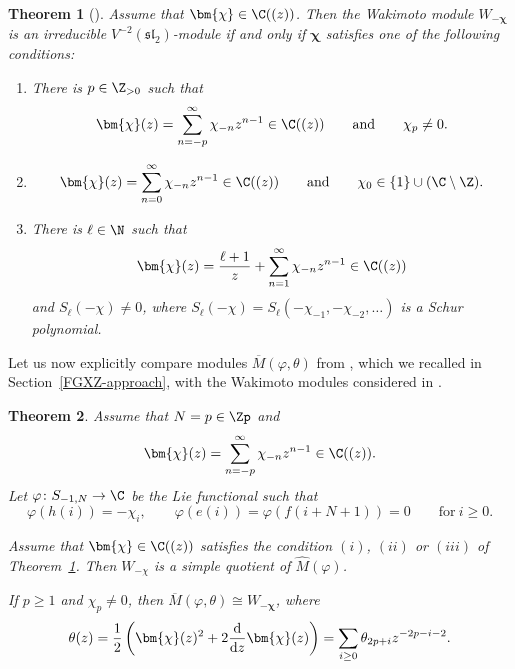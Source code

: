 \documentclass[10pt,a4paper]{amsart}
\numberwithin{equation}{section}
\newtheorem{Theorem}{Theorem}[section]
\theoremstyle{definition}
\newcommand{\1}{\textbf{1}}
\begin{document}
\begin{Theorem}[\cite{A-07, A-14}] \label{A14}
Assume that $\bm{\chi} \in {\C}((z))$. Then the Wakimoto module
$W_{-\bm{\chi}}$ is an irreducible $V^{-2}(\mathfrak{sl}_2)$-module if and only
if $\bm{\chi}$ satisfies one of the following conditions:
\begin{enumerate}\itemsep=0pt
\item[$(i)$] There is $p \in {\Z}_{>0}$
 such that
\[ \bm{\chi}(z) = \sum_{n=-p} ^{\infty} {\chi}_{-n} z ^{n-1} \in
{\C}((z)) \qquad \mbox{and} \qquad
\chi_p \ne 0. \]

\item[$(ii)$] \[ \bm{\chi}(z) = \sum_{n=0} ^{\infty} {\chi}_{-n} z
^{n-1} \in {\C}((z)) \qquad \mbox{and} \qquad
\chi_0 \in \{1 \} \cup ({\C} \setminus {\Z}). \]
\item[$(iii)$] There is $\ell \in {\N}$ such that
\[ \bm{\chi}(z) = \frac{\ell +1}{z} + \sum_{n=1} ^{\infty} {\chi}_{-n} z ^{n-1} \in
{\C}((z))\]
and $S_{\ell}(-\chi) \ne 0$,
where $S_{\ell}(-\chi) = S_{\ell}(-\chi_{-1}, -\chi_{-2}, \dots)$
is a Schur polynomial.
\end{enumerate}
\end{Theorem}

Let us now explicitly compare modules $\overline M(\varphi, \theta )$ from \cite{FGXZ}, which we recalled in Section~\ref{FGXZ-approach}, with the Wakimoto modules considered in \cite{A-07, A-14}.

\begin{Theorem} \label{krit-kvocijenti}
 Assume that $N=p \in {\Zp}$ and
 \[ \bm{\chi}(z) = \sum_{n=-p} ^{\infty} {\chi}_{-n} z ^{n-1} \in
{\C}((z)). \]
Let $\varphi \colon S_{-1, N} \rightarrow {\C}$ be the Lie functional such that \[\varphi(h(i)) = -\chi_i, \qquad \varphi(e(i)) = \varphi(f(i+N+1)) =0 \qquad \mbox{for} \ i \ge 0. \]

Assume that $\bm{\chi} \in {\C}((z))$ satisfies the condition $(i)$, $(ii)$ or $(iii)$ of Theorem~{\rm \ref{A14}}. Then $W_{-\chi}$ is a simple quotient of $\widehat M( \varphi)$.

 If $p\ge 1$ and $\chi_p \ne 0$, then
 $\overline M(\varphi, \theta) \cong W_{-\bm{\chi}}$, where
 \[ \theta(z) = \frac{1}{2} \left( \bm{\chi}(z) ^2 + 2 \frac{{\rm d}}{{\rm d} z}\bm{\chi} (z) \right) = \sum_{i\ge 0} \theta_{2p +i} z^{-2 p- i - 2}. \]
 \end{Theorem}
\end{document}
